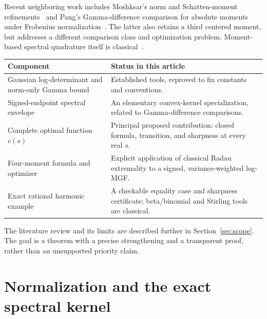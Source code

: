 \documentclass[11pt,letterpaper]{article}
\numberwithin{equation}{section}
\theoremstyle{definition}\newtheorem{definition}[theorem]{Definition}
\theoremstyle{remark}\newtheorem{remark}[theorem]{Remark}
\begin{document}
Recent neighboring work includes Moshksar's norm and Schatten-moment
refinements~\cite{Moshksar} and Pang's Gamma-difference comparison for
absolute moments under Frobenius normalization~\cite{Pang}. The latter
also retains a third centered moment, but addresses a different
comparison class and optimization problem. Moment-based spectral
quadrature itself is classical~\cite{BaiGolub}.

\begin{center}
\small
\begin{tabularx}{\linewidth}{@{}>{\raggedright\arraybackslash}p{.26\linewidth}>{\raggedright\arraybackslash}X@{}}
\toprule
Component & Status in this article\\
\midrule
Gaussian log-determinant and norm-only Gamma bound & Established tools,
reproved to fix constants and conventions.\\
Signed-endpoint spectral envelope & An elementary convex-kernel
specialization, related to Gamma-difference comparisons.\\
Complete optimal function $c(s)$ & Principal proposed contribution:
closed formula, transition, and sharpness at every real $s$.\\
Four-moment formula and optimizer & Explicit application of classical
Radau extremality to a signed, variance-weighted log-MGF.\\
Exact rational harmonic example & A checkable equality case and
sharpness certificate; beta/binomial and Stirling tools are classical.\\
\bottomrule
\end{tabularx}
\end{center}

The literature review and its limits are described further in
Section~\ref{sec:scope}. The goal is a theorem with a precise strengthening
and a transparent proof, rather than an unsupported priority claim.

\section{Normalization and the exact spectral kernel}
\end{document}
